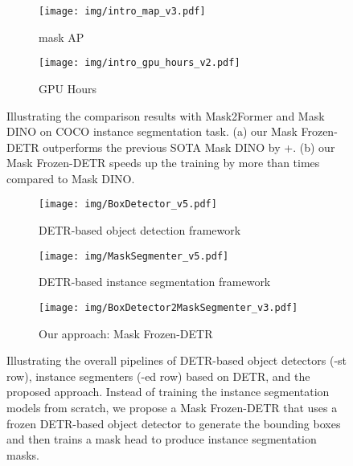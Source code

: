 \documentclass[10pt,twocolumn,letterpaper]{article}
\begin{document}
\begin{figure}[t]
\centering
\begin{minipage}[t]{1\linewidth}
\centering
\begin{subfigure}[b]{\linewidth}
\centering
\texttt{[image: img/intro\_map\_v3.pdf]}
\caption{mask AP}
\end{subfigure}
\hfill
\begin{subfigure}[b]{\linewidth}
\centering
\texttt{[image: img/intro\_gpu\_hours\_v2.pdf]}
\caption{GPU Hours}
\end{subfigure}
\end{minipage}
\caption{\small{Illustrating the comparison results with Mask2Former and Mask DINO on COCO instance segmentation task. (a) our Mask Frozen-DETR outperforms the previous SOTA Mask DINO by +. (b) our Mask Frozen-DETR speeds up the training by more than  times compared to Mask DINO.
}}
\label{fig:attention_maps_intro}
\end{figure}




\begin{figure*}[t]
\begin{minipage}[t]{1\linewidth}
\centering
\begin{subfigure}[b]{1\textwidth}
\centering
\texttt{[image: img/BoxDetector\_v5.pdf]}
\vspace{-3mm}
\caption{\footnotesize{DETR-based object detection framework}}
\end{subfigure}
\begin{subfigure}[b]{1\textwidth}
\centering
\vspace{3mm}
\texttt{[image: img/MaskSegmenter\_v5.pdf]}
\vspace{-5mm}
\caption{\footnotesize{DETR-based instance segmentation framework}}
\end{subfigure}
\begin{subfigure}[b]{1\textwidth}
\centering
\vspace{3mm}
\texttt{[image: img/BoxDetector2MaskSegmenter\_v3.pdf]}
\vspace{-3mm}
\caption{\footnotesize{Our approach: Mask Frozen-DETR}}
\end{subfigure}
\end{minipage}
\caption{\small{Illustrating the overall pipelines of DETR-based object detectors (-st row), instance segmenters (-ed row) based on DETR, and the proposed approach. Instead of training the instance segmentation models from scratch, we propose a Mask Frozen-DETR that uses a frozen DETR-based object detector to generate the bounding boxes and then trains a mask head to produce instance segmentation masks.}}
\label{fig:intro}
\end{figure*}
\end{document}
